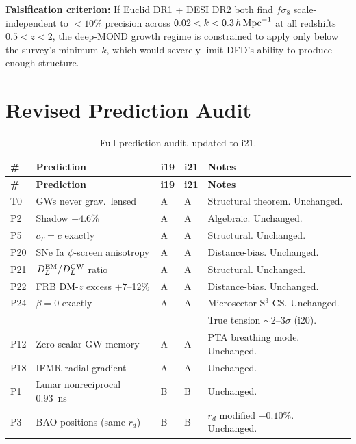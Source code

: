 \documentclass[11pt]{article}
\begin{document}
\begin{tcolorbox}[colback=green!5!white, colframe=green!60!black,
  title=\textbf{SHARPEST NEAR-TERM DFD PREDICTION (2026--2027)}]
\textbf{Falsification criterion:} If Euclid DR1 + DESI DR2 both
find $f\sigma_8$ scale-independent to $<10\%$ precision across
$0.02 < k < 0.3\,h\,{\rm Mpc}^{-1}$ at all redshifts $0.5 < z < 2$,
the deep-MOND growth regime is constrained to apply only below the
survey's minimum $k$, which would severely limit DFD's ability to
produce enough structure.
\end{tcolorbox}


\section{Revised Prediction Audit}
\label{sec:audit}

\begin{longtable}{p{0.5cm}p{4cm}p{1cm}p{1cm}p{5.5cm}}
\caption{Full prediction audit, updated to i21.} \\
\toprule
\textbf{\#} & \textbf{Prediction} & \textbf{i19} & \textbf{i21}
  & \textbf{Notes} \\
\midrule
\endfirsthead
\toprule
\textbf{\#} & \textbf{Prediction} & \textbf{i19} & \textbf{i21}
  & \textbf{Notes} \\
\midrule
\endhead
T0 & GWs never grav.\ lensed & A & A & Structural theorem. Unchanged. \\
P2 & Shadow $+4.6\%$ & A & A & Algebraic. Unchanged. \\
P5 & $c_T = c$ exactly & A & A & Structural. Unchanged. \\
P20 & SNe Ia $\psi$-screen anisotropy & A & A & Distance-bias. Unchanged. \\
P21 & $D_L^{\rm EM}/D_L^{\rm GW}$ ratio & A & A & Structural. Unchanged. \\
P22 & FRB DM-$z$ excess $+7$--12\% & A & A & Distance-bias. Unchanged. \\
P24 & $\beta = 0$ exactly & A & A & Microsector S$^3$ CS. Unchanged. \\
& & & & True tension $\sim$2--3$\sigma$ (i20). \\
P12 & Zero scalar GW memory & A & A & PTA breathing mode. Unchanged. \\
P18 & IFMR radial gradient & A & A & Unchanged. \\
\midrule
P1 & Lunar nonreciprocal 0.93~ns & B & B & Unchanged. \\
P3 & BAO positions (same $r_d$) & B & B & $r_d$ modified $-0.10\%$. Unchanged. \\

\end{longtable}
\end{document}
